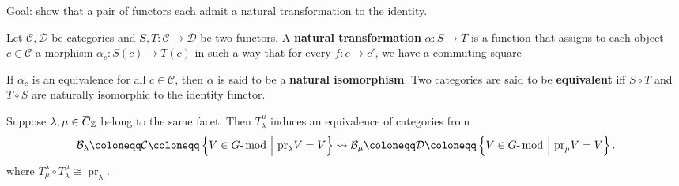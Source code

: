 Goal: show that a pair of functors each admit a natural transformation
to the identity.

\begin{definition}

Let \(\mathcal{C}, \mathcal{D}\) be categories and
\(S, T:\mathcal{C} \to \mathcal{D}\) be two functors. A \textbf{natural
transformation} \(\alpha:S\to T\) is a function that assigns to each
object \(c\in \mathcal{C}\) a morphism \(\alpha_c:S(c) \to T(c)\) in
such a way that for every \(f:c\to c'\), we have a commuting square

\begin{center}
\end{center}

If \(\alpha_c\) is an equivalence for all \(c\in \mathcal{C}\), then
\(\alpha\) is said to be a \textbf{natural isomorphism}. Two categories
are said to be \textbf{equivalent} iff \(S\circ T\) and \(T\circ S\) are
naturally isomorphic to the identity functor.

\end{definition}

\begin{theorem}[?]

Suppose
\(\lambda, \mu \in \mkern 1.5mu\overline{\mkern-1.5muC\mkern-1.5mu}\mkern 1.5mu_{\mathbb{Z}}\)
belong to the same facet. Then \(T_\lambda^\mu\) induces an equivalence
of categories from
\begin{align*}  
\mathcal{B}_\lambda \coloneqq\mathcal{C} \coloneqq\left\{{V\in {{G}{\hbox{-}}\operatorname{mod}} {~\mathrel{\Big|}~}{\operatorname{pr}}_\lambda V = V}\right\} \leadsto
\mathcal{B}_\mu \coloneqq\mathcal{D} \coloneqq\left\{{V\in {{G}{\hbox{-}}\operatorname{mod}} {~\mathrel{\Big|}~}{\operatorname{pr}}_\mu V = V}\right\}
.\end{align*}
where
\(T_\mu^\lambda \circ T_\lambda^\mu \cong {\operatorname{pr}}_\lambda\).

\end{theorem}

